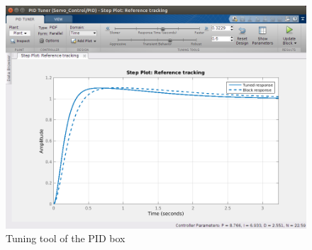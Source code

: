 \begin{figure}[H]
\centering
\includegraphics[scale=0.4]{figures/PID_param.png}
\caption{Tuning tool of the PID box}
\label{dcmotor_circuit}
\end{figure}
  


